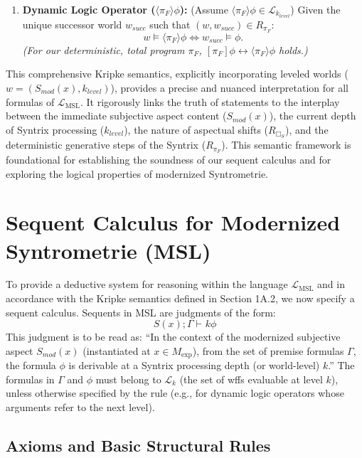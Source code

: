 \documentclass[
    12pt,              %
    a4paper,           %
    headings=normal,   %
    twoside=true,      %
    BCOR=8mm,          %
]{scrbook}
\newcommand{\q}[1]{\enquote{#1}}
\newcommand{\Smodx}{S_{mod}(x)}
\newcommand{\LMSL}{\mathcal{L}_{\text{MSL}}}
\newcommand{\BoxS}{\Box_S}
\newcommand{\dynboxgen}[1]{[#1]}
\newcommand{\dyndiamondgen}[1]{\langle#1\rangle}
\newcommand{\turnstilek}[1][]{\vdash^{#1}}
\newcommand{\Mexp}{M_{\text{exp}}}
\begin{document}
\begin{enumerate}[label=\arabic*.]
    \item  \textbf{Dynamic Logic Operator (\(\dyndiamondgen{\pi_F}\phi\)):}
        (Assume \(\dyndiamondgen{\pi_F}\phi \in \mathcal{L}_{k_{level}}\))
        Given the unique successor world \(w_{succ}\) such that \((w, w_{succ}) \in R_{\pi_F}\):
        \[w \vDash \dyndiamondgen{\pi_F}\phi \iff w_{succ} \vDash \phi.\]
        \textit{(For our deterministic, total program \(\pi_F\), \(\dynboxgen{\pi_F}\phi \leftrightarrow \dyndiamondgen{\pi_F}\phi\) holds.)}
\end{enumerate}
This comprehensive Kripke semantics, explicitly incorporating leveled worlds (\(w = (\Smodx, k_{level})\)), provides a precise and nuanced interpretation for all formulas of \(\LMSL\). It rigorously links the truth of statements to the interplay between the immediate subjective aspect content (\(\Smodx\)), the current depth of Syntrix processing (\(k_{level}\)), the nature of aspectual shifts (\(R_{\BoxS}\)), and the deterministic generative steps of the Syntrix (\(R_{\pi_F}\)). This semantic framework is foundational for establishing the soundness of our sequent calculus and for exploring the logical properties of modernized Syntrometrie.

\section*{Sequent Calculus for Modernized Syntrometrie (MSL)}

To provide a deductive system for reasoning within the language \(\LMSL\) and in accordance with the Kripke semantics defined in Section 1A.2, we now specify a sequent calculus. Sequents in MSL are judgments of the form:
\[ S(x); \Gamma \turnstilek{k} \phi \]
This judgment is to be read as: \q{In the context of the modernized subjective aspect \(\Smodx\) (instantiated at \(x \in \Mexp\)), from the set of premise formulas \(\Gamma\), the formula \(\phi\) is derivable at a Syntrix processing depth (or world-level) \(k\).} The formulas in \(\Gamma\) and \(\phi\) must belong to \(\mathcal{L}_k\) (the set of wffs evaluable at level \(k\)), unless otherwise specified by the rule (e.g., for dynamic logic operators whose arguments refer to the next level).

\subsection*{Axioms and Basic Structural Rules}
\end{document}
